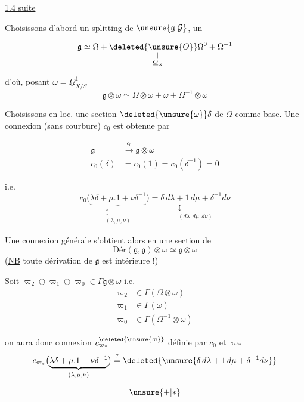 
\uline{1.4 suite}

Choisissons d'abord un splitting de  $\unsure{\mathfrak g|\mathcal G}$, un

\[ \mathfrak g\simeq\Omega+\underset{\substack{\Vert\\\underline O_X}}{\deleted{\unsure{O}}\Omega^0}+\Omega^{-1} \]

d'où, posant $\omega=\underline\Omega^1_{X/S}$
\[ \mathfrak g\otimes\omega\simeq\Omega\otimes\omega+\omega+\Omega^{-1}\otimes\omega \]

 Choisissons-en loc. une section $\deleted{\unsure{\omega}}\delta$ de $\Omega$ comme base. Une connexion (sans courbure) $c_0$ est obtenue par

\[ \begin{aligned}
 \mathfrak g&\xrightarrow{c_0}\mathfrak g\otimes\omega\\
 c_0(\delta)&=c_0(1)=c_0(\delta^{-1})=0
 \end{aligned} \]

i.e.
\[ c_0\bigl(\underbrace{\lambda\delta+\mu.1+\nu\delta^{-1}}_{\substack{\updownarrow\\(\lambda,\mu,\nu)}}\bigr)=\underset{\substack{\updownarrow\\(d\lambda,d\mu,d\nu)}}{\delta\,d\lambda+1\,d\mu+\delta^{-1}d\nu} \]

Une connexion générale s'obtient alors en  une section de
\[ \mathrm{Dér}(\mathfrak g,\mathfrak g)\otimes\omega\simeq\mathfrak g\otimes\omega \]
(\uline{NB} toute dérivation de $\mathfrak g$ est intérieure !)

Soit \inserted{$\varpi_{\unsure{*|\bullet}}={}$} $\varpi_2\oplus\varpi_1\oplus\varpi_0\in\Gamma\mathfrak g\otimes\omega$ i.e.
\[ \begin{aligned}
 \varpi_2&\in\Gamma(\Omega\otimes\omega)\\
 \varpi_1&\in\Gamma(\omega)\\
 \varpi_0&\in\Gamma(\Omega^{-1}\otimes\omega)
 \end{aligned} \]

on aura donc  connexion $c^{\deleted{\unsure{\varpi}}}_{\varpi_*}$ définie par $c_0$ et $\varpi_*$ 
\[ c_{\varpi_*}\bigl(\underbrace{\lambda\delta+\mu.1+\nu\delta^{-1}}_{(\lambda,\mu,\nu)}\bigr)\overset{?}{=}\deleted{\unsure{\delta\,d\lambda+1\,d\mu+\delta^{-1}d\nu}} \]

\[ \unsure{+|\ast} \]

